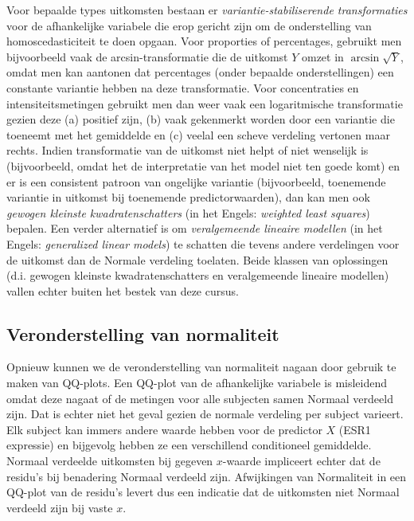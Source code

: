 \documentclass[
  dutch,
  letterpaper,
  12pt]{book}
\theoremstyle{definition}
\theoremstyle{definition}
\theoremstyle{definition}
\theoremstyle{remark}
\begin{document}
Voor bepaalde types uitkomsten bestaan er \emph{variantie-stabiliserende
transformaties} voor de afhankelijke variabele die erop gericht zijn om
de onderstelling van homoscedasticiteit te doen opgaan. Voor proporties
of percentages, gebruikt men bijvoorbeeld vaak de arcsin-transformatie
die de uitkomst \(Y\) omzet in \(\arcsin\sqrt{Y}\), omdat men kan
aantonen dat percentages (onder bepaalde onderstellingen) een constante
variantie hebben na deze transformatie. Voor concentraties en
intensiteitsmetingen gebruikt men dan weer vaak een logaritmische
transformatie gezien deze (a) positief zijn, (b) vaak gekenmerkt worden
door een variantie die toeneemt met het gemiddelde en (c) veelal een
scheve verdeling vertonen maar rechts. Indien transformatie van de
uitkomst niet helpt of niet wenselijk is (bijvoorbeeld, omdat het de
interpretatie van het model niet ten goede komt) en er is een consistent
patroon van ongelijke variantie (bijvoorbeeld, toenemende variantie in
uitkomst bij toenemende predictorwaarden), dan kan men ook \emph{gewogen
kleinste kwadratenschatters} (in het Engels: \emph{weighted least
squares}) bepalen. Een verder alternatief is om \emph{veralgemeende
lineaire modellen} (in het Engels: \emph{generalized linear models}) te
schatten die tevens andere verdelingen voor de uitkomst dan de Normale
verdeling toelaten. Beide klassen van oplossingen (d.i. gewogen kleinste
kwadratenschatters en veralgemeende lineaire modellen) vallen echter
buiten het bestek van deze cursus.

\subsection{Veronderstelling van
normaliteit}\label{veronderstelling-van-normaliteit}

Opnieuw kunnen we de veronderstelling van normaliteit nagaan door
gebruik te maken van QQ-plots. Een QQ-plot van de afhankelijke variabele
is misleidend omdat deze nagaat of de metingen voor alle subjecten samen
Normaal verdeeld zijn. Dat is echter niet het geval gezien de normale
verdeling per subject varieert. Elk subject kan immers andere waarde
hebben voor de predictor \(X\) (ESR1 expressie) en bijgevolg hebben ze
een verschillend conditioneel gemiddelde. Normaal verdeelde uitkomsten
bij gegeven \(x\)-waarde impliceert echter dat de residu's bij
benadering Normaal verdeeld zijn. Afwijkingen van Normaliteit in een
QQ-plot van de residu's levert dus een indicatie dat de uitkomsten niet
Normaal verdeeld zijn bij vaste \(x\).
\end{document}
